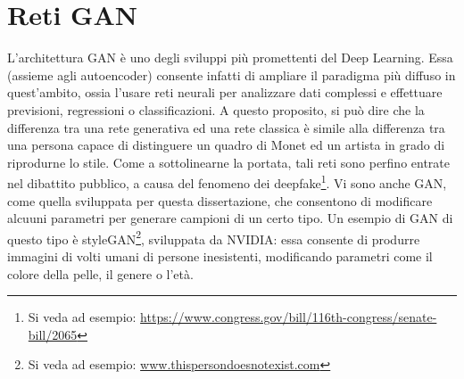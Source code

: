 \documentclass[a4paper]{article}
\begin{document}
\section{Reti GAN}
L'architettura GAN è uno degli sviluppi più promettenti del Deep Learning. Essa (assieme agli autoencoder) consente infatti di ampliare il paradigma più diffuso in quest'ambito, ossia l'usare reti neurali per analizzare dati complessi e effettuare previsioni, regressioni o classificazioni. A questo proposito, si può dire che la differenza tra una rete generativa ed una rete classica è simile alla differenza tra una persona capace di distinguere un quadro di Monet ed un artista in grado di riprodurne lo stile. Come a sottolinearne la portata, tali reti sono perfino entrate nel dibattito pubblico, a causa del fenomeno dei deepfake\footnote{Si veda ad esempio: \url{https://www.congress.gov/bill/116th-congress/senate-bill/2065}}. Vi sono anche GAN, come quella sviluppata per questa dissertazione, che consentono di modificare alcuuni parametri per generare campioni di un certo tipo. Un esempio di GAN di questo tipo è styleGAN\footnote{Si veda ad esempio: \url{www.thispersondoesnotexist.com}}, sviluppata da NVIDIA: essa consente di produrre immagini di volti umani di persone inesistenti, modificando parametri come il colore della pelle, il genere o l'età.\cite{stylegan}\\
\end{document}
